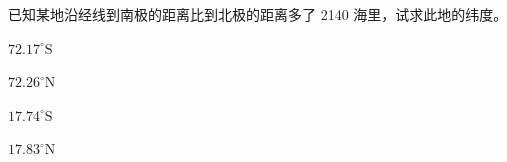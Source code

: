 \documentclass[12pt,a4paper]{exam-zh}
\begin{document}

    
    
    

\begin{question}
    已知某地沿经线到南极的距离比到北极的距离多了 2140 海里，试求此地的纬度。
    \begin{choices}
        \item $72.17^\circ\text{S}$
        \item $72.26^\circ\text{N}$
        \item $17.74^\circ\text{S}$
        \item $17.83^\circ\text{N}$
    \end{choices}
\end{question}
\end{document}
